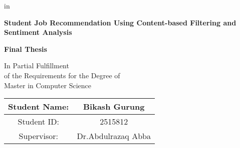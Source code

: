 \begin{titlepage}

 in
\begin{center}
\Large \textbf{Student Job Recommendation Using Content-based Filtering and Sentiment Analysis}

\large

\vspace*{2cm}



\vspace{2cm}

\normalsize \textbf{Final Thesis}

\vfill

\normalsize
In Partial Fulfillment\\
of the Requirements for the Degree of\\
Master in Computer Science


\vspace*{3cm}

\begin{tabular}{|c|c|}
\hline
Student Name:&Bikash Gurung\\
\hline
Student ID:& 2515812\\
\hline
Supervisor:&Dr.Abdulrazaq Abba\\
\hline
\end{tabular}




\end{center}
\end{titlepage}